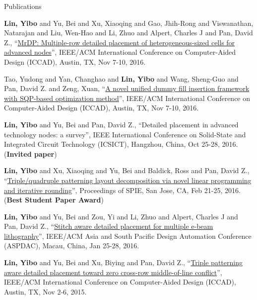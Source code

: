 \begin{rSection}{Publications}
\begin{description}[font=\normalfont]
\item[{[C8]}]{
        \textbf{Lin, Yibo} and Yu, Bei and Xu, Xiaoqing and Gao, Jhih-Rong and Viswanathan, Natarajan and Liu, Wen-Hao and Li, Zhuo and Alpert, Charles J and Pan, David Z., 
    ``\href{http://dx.doi.org/10.1145/2966986.2967055}{MrDP: Multiple-row detailed placement of heterogeneous-sized cells for advanced nodes}'', 
    IEEE/ACM International Conference on Computer-Aided Design (ICCAD), Austin, TX, Nov 7-10, 2016.
    
}
        

\item[{[C7]}]{
        Tao, Yudong and Yan, Changhao and \textbf{Lin, Yibo} and Wang, Sheng-Guo and Pan, David Z. and Zeng, Xuan, 
    ``\href{http://dx.doi.org/10.1145/2966986.2966994}{A novel unified dummy fill insertion framework with SQP-based optimization method}'', 
    IEEE/ACM International Conference on Computer-Aided Design (ICCAD), Austin, TX, Nov 7-10, 2016.
    
}
        

\item[{[C6]}]{
        \textbf{Lin, Yibo} and Yu, Bei and Pan, David Z., 
    ``Detailed placement in advanced technology nodes: a survey'', 
    IEEE International Conference on Solid-State and Integrated Circuit Technology (ICSICT), Hangzhou, China, Oct 25-28, 2016.
    (\textbf{Invited paper})
}
        

\item[{[C5]}]{
        \textbf{Lin, Yibo} and Xu, Xiaoqing and Yu, Bei and Baldick, Ross and Pan, David Z., 
    ``\href{http://dx.doi.org/10.1117/12.2218628}{Triple/quadruple patterning layout decomposition via novel linear programming and iterative rounding}'', 
    Proceedings of SPIE, San Jose, CA, Feb 21-25, 2016.
    (\textbf{Best Student Paper Award})
}
        

\item[{[C4]}]{
        \textbf{Lin, Yibo} and Yu, Bei and Zou, Yi and Li, Zhuo and Alpert, Charles J and Pan, David Z., 
    ``\href{http://ieeexplore.ieee.org/xpl/articleDetails.jsp?arnumber=7428009}{Stitch aware detailed placement for multiple e-beam lithography}'', 
    IEEE/ACM Asia and South Pacific Design Automation Conference (ASPDAC), Macau, China, Jan 25-28, 2016.
    
}
        

\item[{[C3]}]{
        \textbf{Lin, Yibo} and Yu, Bei and Xu, Biying and Pan, David Z., 
    ``\href{http://dl.acm.org/citation.cfm?id=2840875}{Triple patterning aware detailed placement toward zero cross-row middle-of-line conflict}'', 
    IEEE/ACM International Conference on Computer-Aided Design (ICCAD), Austin, TX, Nov 2-6, 2015.
    
}
\end{description}
\end{rSection}
